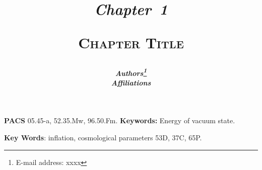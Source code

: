 \documentclass[11pt,twoside,letterpaper]{article} %
\begin{document}
\title{
{\begin{flushleft}
\vskip 0.45in
{\normalsize\bfseries\textit{Chapter~1}}
\end{flushleft}
\vskip 0.45in
\bfseries\scshape Chapter Title}}
\author{\bfseries\itshape Authors\thanks{E-mail address: xxxx}\\
Affiliations}
\date{}
\maketitle
\thispagestyle{empty}
\setcounter{page}{1}
\thispagestyle{fancy}
\fancyhead{}
\fancyfoot{}
\renewcommand{\headrulewidth}{0pt}

\vspace{2in}

\noindent \textbf{PACS} 05.45-a, 52.35.Mw, 96.50.Fm.
\vspace{.08in} \noindent \textbf{Keywords:} Energy of vacuum state.

\noindent \textbf{Key Words}: inflation, cosmological parameters
\vspace{.08in}  53D, 37C, 65P.



\pagestyle{fancy}
\fancyhead{}
\fancyhead[EL,OR]{\thepage}
\fancyfoot{}
\renewcommand\headrulewidth{0.5pt} 





\label{lastpage-01}
\end{document}
